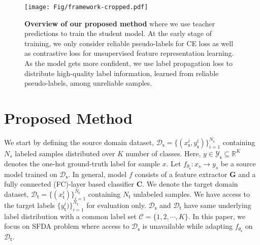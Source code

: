 \documentclass[10pt,twocolumn,letterpaper]{article}
\begin{document}
\begin{figure}[t]
    \centering
    \texttt{[image: Fig/framework-cropped.pdf]}
    \caption{\footnotesize \textbf{Overview of our proposed method} where we use teacher predictions to train the student model. At the early stage of training, we only consider reliable pseudo-labels for CE loss as well as contrastive loss for unsupervised feature representation learning. As the model gets more confident, we use label propagation loss to distribute high-quality label information, learned from reliable pseudo-labels, among unreliable samples. }
    \label{fig:framework}
    \vspace{-3mm}
\end{figure}
\section{Proposed Method}
We start by defining the source domain dataset,   $\mathcal{D}_\mathsf{s}=\{(x_\mathsf{s}^i,y_\mathsf{s}^i )\}_{i=1}^{N_\mathsf{s}}$ containing $N_s$ labeled samples distributed over $K$ number of classes. Here, $y\in\mathcal Y_\mathsf{s}\subseteq\mathbb R^{K} $ denotes the one-hot ground-truth label for sample $x$. Let $f_{\theta_\mathsf{s}}: x_s \rightarrow y_s$ be a source model trained on $\mathcal{D}_\mathsf{s}$. In general, model $f$ consists of a feature extractor $\mathbf{G}$ and a fully connected (FC)-layer based classifier $\mathbf{C}$.  
We denote the target domain dataset, $\mathcal{D}_\mathsf{t}=\{(x_\mathsf{t}^i)\}_{i=1}^{N_\mathsf{t}}$ containing $N_\mathsf{t}$ unlabeled samples. We have access to the target labels $\{y_\mathsf{t}^i)\}_{i=1}^{N_\mathsf{t}}$ for evaluation only. $\mathcal{D}_\mathsf{s}$ and $\mathcal{D}_\mathsf{t}$ have same underlying label distribution with a common label set  $\mathcal{C}=\{1,2,\cdots,K\}$. In this paper, we focus on SFDA problem where access to $\mathcal{D}_\mathsf{s}$ is unavailable while adapting $f_{\theta_\mathsf{s}}$ on $\mathcal{D}_\mathsf{t}$. 
\vspace{-0.5mm}
\end{document}
